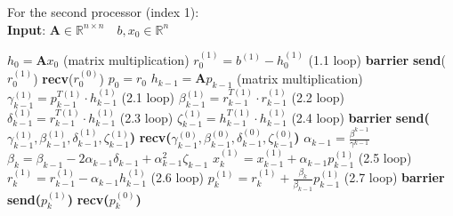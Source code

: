 \documentclass{article}
\begin{document}
\begin{enumerate}[label=(\alph*)]
For the second processor (index 1):
\\
\textbf{Input}: $ \textbf{A} \in \mathbb{R}^{n\times n} \quad b, x_0\in \mathbb{R}^n$ 
    \begin{algorithmic}[1]
	\State $h_{0} = \textbf{A}x_{0}$ (matrix multiplication)
	\State $r_0^{(1)} = b^{(1)} - h_0^{(1)}$ (1.1 loop)
	\State \textbf{barrier}
	\State \textbf{send}($r_0^{(1)}$)
	\State \textbf{recv}($r_0^{(0)}$)
	\State $p_0 = r_0$
	\State $h_{k-1} = \textbf{A}p_{k-1}$ (matrix multiplication)
	\State $\gamma_{k-1}^{(1)} = p^{T(1)}_{k-1}\cdot h_{k-1}^{(1)}$ (2.1 loop)
	\State $\beta_{k-1}^{(1)} = r^{T(1)}_{k-1}\cdot r_{k-1}^{(1)}$ (2.2 loop)
	\State $\delta_{k-1}^{(1)} = r^{T(1)}_{k-1}\cdot h_{k-1}^{(1)}$ (2.3 loop)
	\State $\zeta_{k-1}^{(1)} = h^{T(1)}_{k-1}\cdot h_{k-1}^{(1)}$ (2.4 loop)
	\State \textbf{barrier}
	\State \textbf{send($\gamma_{k-1}^{(1)}, \beta_{k-1}^{(1)}, \delta_{k-1}^{(1)}, \zeta_{k-1}^{(1)}$)}      	
	\State \textbf{recv($\gamma_{k-1}^{(0)}, \beta_{k-1}^{(0)}, \delta_{k-1}^{(0)}, \zeta_{k-1}^{(0)}$)}
	\State $\alpha_{k-1} = \frac{\beta^{k-1}}{\gamma^{k-1}}$
	\State $\beta_{k} = \beta_{k-1} - 2 \alpha_{k-1} \delta_{k-1} + \alpha_{k-1}^2\zeta_{k-1}$
	\State $x_k^{(1)} = x_{k-1}^{(1)}  + \alpha_{k-1}p_{k-1}^{(1)} $ (2.5 loop)
	\State $r_k^{(1)}  = r_{k-1}^{(1)}  - \alpha_{k-1}h_{k-1}^{(1)} $ (2.6 loop)
	\State $p_k^{(1)}  = r_{k}^{(1)}  + \frac{\beta_k}{\beta_{k-1}}p_{k-1}^{(1)} $ (2.7 loop)
	\State \textbf{barrier}
	\State \textbf{send($p_{k}^{(1)} $)}	
	\State \textbf{recv($p_{k}^{(0)} $)}
	\EndFor
    \end{algorithmic} 

\end{enumerate} 
\end{document}
